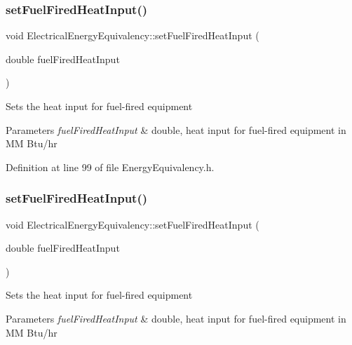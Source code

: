 \subsubsection{\texorpdfstring{set\+Fuel\+Fired\+Heat\+Input()}{setFuelFiredHeatInput()}\hspace{0.1cm}{\footnotesize\ttfamily [2/3]}}
{\footnotesize\ttfamily void Electrical\+Energy\+Equivalency\+::set\+Fuel\+Fired\+Heat\+Input (\begin{DoxyParamCaption}\item[{double}]{fuel\+Fired\+Heat\+Input }\end{DoxyParamCaption})\hspace{0.3cm}{\ttfamily [inline]}}

Sets the heat input for fuel-\/fired equipment


\begin{DoxyParams}{Parameters}
{\em fuel\+Fired\+Heat\+Input} & double, heat input for fuel-\/fired equipment in MM Btu/hr \\
\hline
\end{DoxyParams}


Definition at line 99 of file Energy\+Equivalency.\+h.

\mbox{\label{class_electrical_energy_equivalency_a9daf2b93c52c31cb999e5a9a18f1dd54}} 
\subsubsection{\texorpdfstring{set\+Fuel\+Fired\+Heat\+Input()}{setFuelFiredHeatInput()}\hspace{0.1cm}{\footnotesize\ttfamily [3/3]}}
{\footnotesize\ttfamily void Electrical\+Energy\+Equivalency\+::set\+Fuel\+Fired\+Heat\+Input (\begin{DoxyParamCaption}\item[{double}]{fuel\+Fired\+Heat\+Input }\end{DoxyParamCaption})\hspace{0.3cm}{\ttfamily [inline]}}

Sets the heat input for fuel-\/fired equipment


\begin{DoxyParams}{Parameters}
{\em fuel\+Fired\+Heat\+Input} & double, heat input for fuel-\/fired equipment in MM Btu/hr \\
\hline
\end{DoxyParams}


